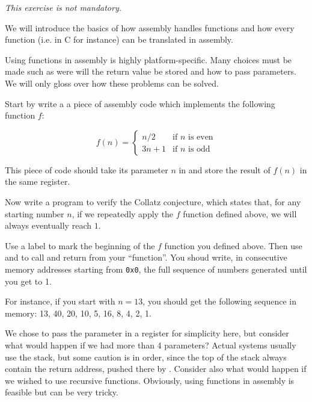\documentclass{../../tp}
\begin{document}
\begin{flushright}
	\small
	\itshape
	This exercise is not mandatory.
\end{flushright}
We will introduce the basics of how assembly handles functions and how every function (i.e. in C for instance) can be translated in assembly. 

Using functions in assembly is highly platform-specific. Many choices must be made such as were will the return value be stored and how to pass parameters. We will only gloss over how these problems can be solved. 

\begin{instruction}
	Start by write a a piece of assembly code which implements the following function $f$:
	
	\begin{equation*}
		f(n) = 
		\begin{cases}
			n/2 & \text{if $n$ is even} \\
			3n + 1 & \text{if $n$ is odd} 
		\end{cases}
	\end{equation*}
	
	This piece of code should take its parameter $n$ in  and store the result of $f(n)$ in the same register.
	
	Now write a program to verify the Collatz conjecture, which states that, for any starting number $n$, if we repeatedly apply the $f$ function defined above, we will always eventually reach $1$.
	
	Use a label to mark the beginning of the $f$ function you defined above. Then use  and  to call and return from your ``function''. You shoud write, in consecutive memory addresses starting from \texttt{0x0}, the full sequence of numbers generated until you get to 1. 
	
	For instance, if you start with $n = 13$, you should get the following sequence in memory:
	13, 40, 20, 10, 5, 16, 8, 4, 2, 1.
	
\end{instruction}


We chose to pass the parameter in a register for simplicity here, but consider what would happen if we had more than 4 parameters? Actual systems usually use the stack, but some caution is in order, since the top of the stack always contain the return address, pushed there by . Consider also what would happen if we wished to use recursive functions. Obviously, using functions in assembly is feasible but can be very tricky.
\end{document}
